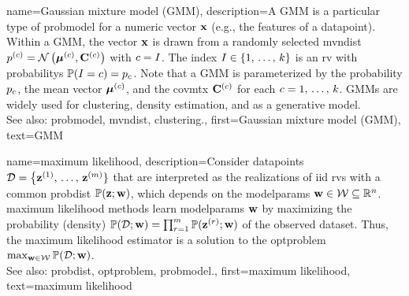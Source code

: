 {name={Gaussian mixture model (GMM)}, 
	description={A GMM 
		is a particular type of \gls{probmodel} for a numeric \gls{vector} ${\bf x}$ (e.g., 
		the \glspl{feature} of a \gls{datapoint}). Within a GMM, the \gls{vector} ${\bf x}$ is drawn from a randomly 
		selected \gls{mvndist} $p^{(c)} = \mathcal{N}\left({\bm \mu}^{(c)},\mathbf{C}^{(c)}\right)$ with 
		$c = I$. The index $I \in \{1, \,\ldots, \,k\}$ is an \gls{rv} with \glspl{probability} $\mathbb{P}({I=c}) = p_{c}$.
	     	Note that a GMM is parameterized by the \gls{probability} $p_{c}$, the 
		\gls{mean} \gls{vector} ${\bm \mu}^{(c)}$, and the \gls{covmtx} $\mathbf{C}^{(c)}$ for each $c=1, \,\ldots, \,k$. 
		GMMs are widely used for \gls{clustering}, density estimation, and as a generative \gls{model}. 
				\\
		See also: \gls{probmodel}, \gls{mvndist}, \gls{clustering}.},
	first={Gaussian mixture model (GMM)},
	text={GMM} 
}
 
{name={maximum likelihood}, 
	description={Consider \glspl{datapoint} $\mathcal{D}=\big\{ {\bf z}^{(1)}, \,\ldots, \,{\bf z}^{(m)} \}$ 
		that are interpreted as the \glspl{realization} of \gls{iid} \glspl{rv} with a common \gls{probdist} $\mathbb{P}({{\bf z}; {\bf w}})$, which 
		depends on the \gls{modelparams} ${\bf w} \in \mathcal{W} \subseteq \mathbb{R}^{n}$. 
		\Gls{maximum} likelihood methods learn \gls{modelparams} ${\bf w}$ by maximizing 
		the probability (density) $\mathbb{P}({\mathcal{D}; {\bf w}}) = \prod_{r=1}^{m} \mathbb{P}({{\bf z}^{(r)}; {\bf w}})$ 
		of the observed \gls{dataset}. Thus, the \gls{maximum} likelihood estimator is a 
		solution to the \gls{optproblem} $\max_{{\bf w} \in \mathcal{W}} \mathbb{P}({\mathcal{D}; {\bf w}})$.
				\\
		See also: \gls{probdist}, \gls{optproblem}, \gls{probmodel}.},
	first={maximum likelihood},
	text={maximum likelihood}
}


